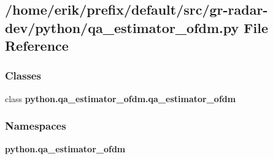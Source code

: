\subsection{/home/erik/prefix/default/src/gr-\/radar-\/dev/python/qa\+\_\+estimator\+\_\+ofdm.py File Reference}
\label{qa__estimator__ofdm_8py}
\subsubsection*{Classes}
\begin{DoxyCompactItemize}
\item 
class {\bf python.\+qa\+\_\+estimator\+\_\+ofdm.\+qa\+\_\+estimator\+\_\+ofdm}
\end{DoxyCompactItemize}
\subsubsection*{Namespaces}
\begin{DoxyCompactItemize}
\item 
 {\bf python.\+qa\+\_\+estimator\+\_\+ofdm}
\end{DoxyCompactItemize}
